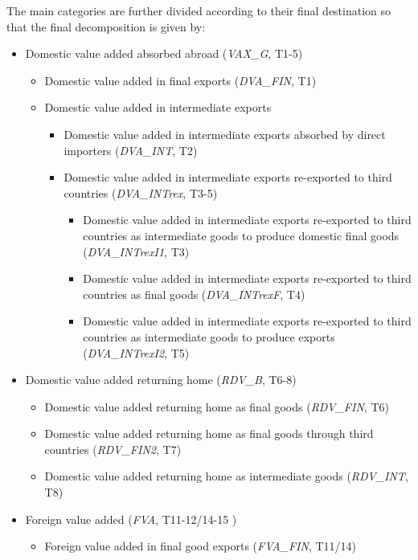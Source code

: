 \documentclass[a4paper]{article}\usepackage[]{graphicx}\usepackage[]{color}
\begin{document}
The main categories are further divided according to their final destination
so that the final decomposition is given by: 
\begin{itemize}
\item Domestic value added absorbed abroad (\textit{VAX\_G}, T1-5) 

\begin{itemize}
\item Domestic value added in final exports (\textit{DVA\_FIN}, T1) 
\item Domestic value added in intermediate exports 

\begin{itemize}
\item Domestic value added in intermediate exports absorbed by direct importers
(\textit{DVA\_INT}, T2) 
\item Domestic value added in intermediate exports re-exported to third
countries (\textit{DVA\_INTrex}, T3-5) 

\begin{itemize}
\item Domestic value added in intermediate exports re-exported to third
countries as intermediate goods to produce domestic final goods (\textit{DVA\_INTrexI1},
T3) 
\item Domestic value added in intermediate exports re-exported to third
countries as final goods (\textit{DVA\_INTrexF}, T4) 
\item Domestic value added in intermediate exports re-exported to third
countries as intermediate goods to produce exports (\textit{DVA\_INTrexI2},
T5) 
\end{itemize}
\end{itemize}
\end{itemize}
\item Domestic value added returning home (\textit{RDV\_B}, T6-8) 

\begin{itemize}
\item Domestic value added returning home as final goods (\textit{RDV\_FIN},
T6) 
\item Domestic value added returning home as final goods through third countries
(\textit{RDV\_FIN2}, T7) 
\item Domestic value added returning home as intermediate goods (\textit{RDV\_INT},
T8) 
\end{itemize}
\item Foreign value added (\textit{FVA}, T11-12/14-15 ) 

\begin{itemize}
\item Foreign value added in final good exports (\textit{FVA\_FIN}, T11/14)


\end{itemize}
\end{itemize}
\end{document}
